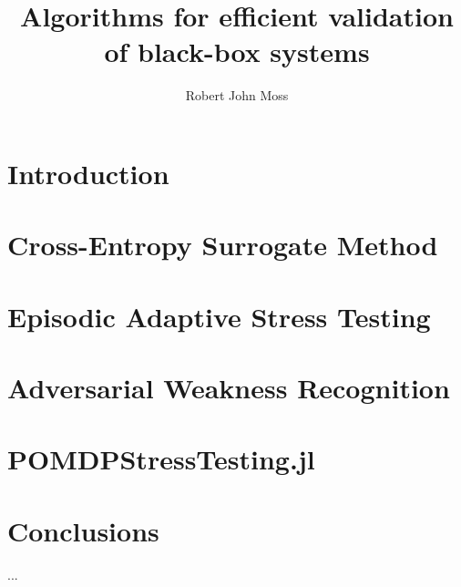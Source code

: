 \documentclass{report}
\let\includebody\undefined %
\begin{document}
\title{Algorithms for efficient validation of black-box systems}
\author{Robert John Moss}


\beforepreface
{}

% 

\afterpreface


\chapter{Introduction}


\ifdefined\includebody
    \chapter{Cross-Entropy Surrogate Method} %
    

    \chapter{Episodic Adaptive Stress Testing}
    

    \chapter{Adversarial Weakness Recognition}
    

    \chapter{POMDPStressTesting.jl}
    
\fi

\chapter{Conclusions}
...

\appendix
\ifdefined\includebody
    
\fi

% 
% 
\printbibliography
\end{document}
